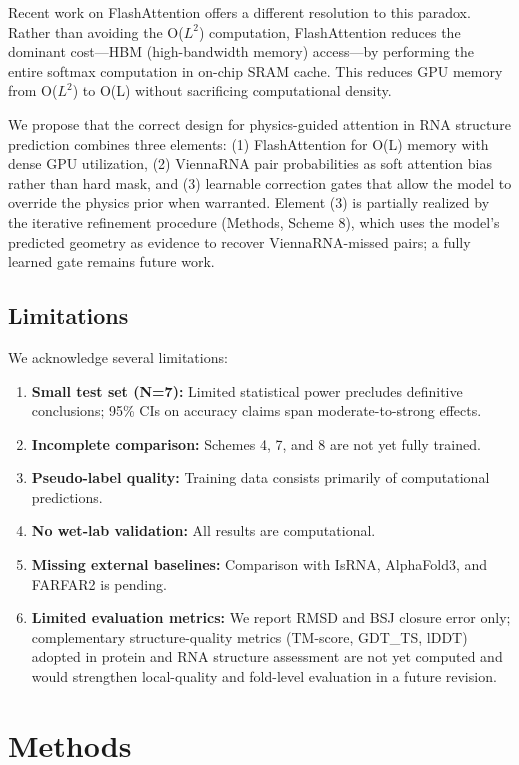 \documentclass[12pt]{article}
\begin{document}
Recent work on FlashAttention \citep{dao2023} offers a different resolution to this paradox. Rather than avoiding the O($L^2$) computation, FlashAttention reduces the dominant cost---HBM (high-bandwidth memory) access---by performing the entire softmax computation in on-chip SRAM cache. This reduces GPU memory from O($L^2$) to O(L) without sacrificing computational density.

We propose that the correct design for physics-guided attention in RNA structure prediction combines three elements: (1) FlashAttention for O(L) memory with dense GPU utilization, (2) ViennaRNA pair probabilities as soft attention bias rather than hard mask, and (3) learnable correction gates that allow the model to override the physics prior when warranted. Element (3) is partially realized by the iterative refinement procedure (Methods, Scheme 8), which uses the model's predicted geometry as evidence to recover ViennaRNA-missed pairs; a fully learned gate remains future work.

\subsection{Limitations}

We acknowledge several limitations:
\begin{enumerate}
\item \textbf{Small test set (N=7):} Limited statistical power precludes definitive conclusions; 95\% CIs on accuracy claims span moderate-to-strong effects.
\item \textbf{Incomplete comparison:} Schemes 4, 7, and 8 are not yet fully trained.
\item \textbf{Pseudo-label quality:} Training data consists primarily of computational predictions.
\item \textbf{No wet-lab validation:} All results are computational.
\item \textbf{Missing external baselines:} Comparison with IsRNA, AlphaFold3, and FARFAR2 is pending.
\item \textbf{Limited evaluation metrics:} We report RMSD and BSJ closure error only; complementary structure-quality metrics (TM-score, GDT\_TS, lDDT) adopted in protein and RNA structure assessment are not yet computed and would strengthen local-quality and fold-level evaluation in a future revision.
\end{enumerate}

\section{Methods}
\end{document}
